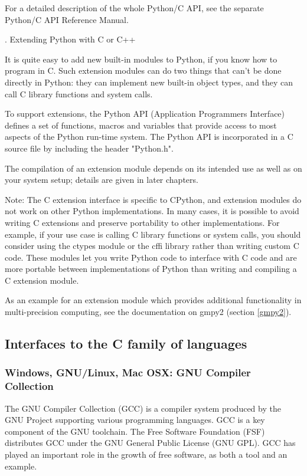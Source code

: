 For a detailed description of the whole Python/C API, see the separate Python/C API Reference Manual.

. Extending Python with C or C++

It is quite easy to add new built-in modules to Python, if you know how to program in C. Such extension modules can do two things that can’t be done directly in Python: they can implement new built-in object types, and they can call C library functions and system calls.

To support extensions, the Python API (Application Programmers Interface) defines a set of functions, macros and variables that provide access to most aspects of the Python run-time system. The Python API is incorporated in a C source file by including the header "Python.h".

The compilation of an extension module depends on its intended use as well as on your system setup; details are given in later chapters.

Note:
The C extension interface is specific to CPython, and extension modules do not work on other Python implementations. In many cases, it is possible to avoid writing C extensions and preserve portability to other implementations. For example, if your use case is calling C library functions or system calls, you should consider using the ctypes module or the cffi library rather than writing custom C code. These modules let you write Python code to interface with C code and are more portable between implementations of Python than writing and compiling a C extension module.

As an example for an extension module which provides additional functionality in multi-precision computing, see the documentation on gmpy2 (section \ref{gmpy2}).





\subsection{Interfaces to the C family of languages}

\subsubsection{Windows, GNU/Linux, Mac OSX: GNU Compiler Collection}
The GNU Compiler Collection (GCC) is a compiler system produced by the GNU Project supporting various programming languages. GCC is a key component of the GNU toolchain. The Free Software Foundation (FSF) distributes GCC under the GNU General Public License (GNU GPL). GCC has played an important role in the growth of free software, as both a tool and an example.

